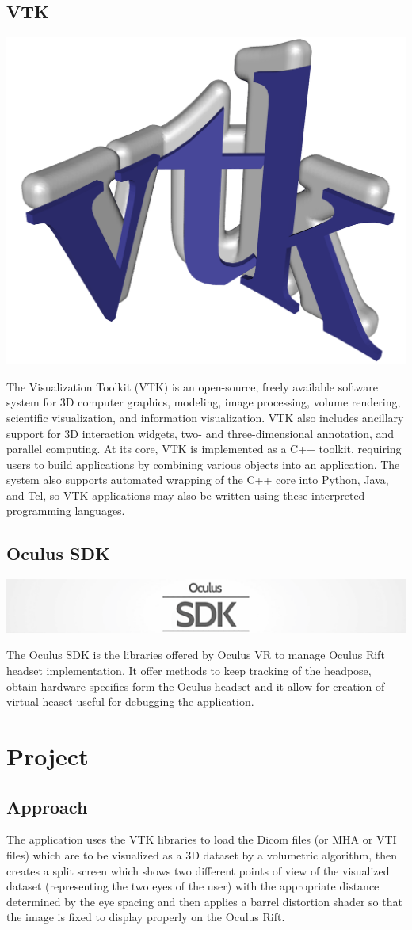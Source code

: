 \documentclass[11pt]{article} %
\begin{document}
\subsection{VTK}
\includegraphics[width=0.2\linewidth]{VTK.png}

The Visualization Toolkit (VTK) is an open-source, freely available software system for 3D computer graphics, modeling, image processing, volume rendering, scientific visualization, and information visualization. VTK also includes ancillary support for 3D interaction widgets, two- and three-dimensional annotation, and parallel computing. At its core, VTK is implemented as a C++ toolkit, requiring users to build applications by combining various objects into an application. The system also supports automated wrapping of the C++ core into Python, Java, and Tcl, so VTK applications may also be written using these interpreted programming languages.

\subsection{Oculus SDK}
\includegraphics[width=0.4\linewidth,clip,trim=7cm -3mm 5cm -2mm]{Oculus_sdk.png}

The Oculus SDK is the libraries offered by Oculus VR to manage Oculus Rift headset implementation. It offer methods to keep tracking of the headpose, obtain hardware specifics form the Oculus headset and it allow for creation of virtual heaset useful for debugging the application.













\newpage
\section{Project}

\subsection{Approach}
The application uses the VTK libraries to load the Dicom files (or MHA or VTI files) which are to be visualized as a 3D dataset by a volumetric algorithm, then creates a split screen which shows two different points of view of the visualized dataset (representing the two eyes of the user) with the appropriate distance determined by the eye spacing and then applies a barrel distortion shader so that the image is fixed to display properly on the Oculus Rift.
\end{document}
